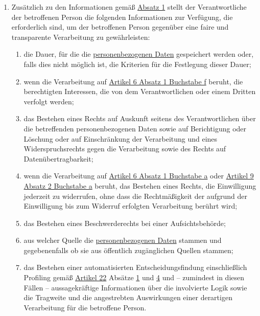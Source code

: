 \begin{enumerate}
\begin{enumerate}
  \end{enumerate}

  \item Zusätzlich zu den Informationen gemäß \hyperref[itm:14-1]{Absatz 1} stellt der Verantwortliche der betroffenen
   Person die folgenden Informationen zur Verfügung, die erforderlich sind, um der betroffenen Person gegenüber eine
   faire und transparente Verarbeitung zu gewährleisten:
  \label{itm:14-2}

  \begin{enumerate}
  
    \item die Dauer, für die die \hyperref[itm:04-1]{personenbezogenen Daten} gespeichert werden oder, falls dies nicht möglich ist, die
     Kriterien für die Festlegung dieser Dauer;
    \label{itm:14-2a}

    \item wenn die Verarbeitung auf \hyperref[itm:06-1f]{Artikel 6 Absatz 1 Buchstabe f} beruht, die berechtigten
     Interessen, die von dem Verantwortlichen oder einem Dritten verfolgt werden;
    \label{itm:14-2b}

    \item das Bestehen eines Rechts auf Auskunft seitens des Verantwortlichen über die betreffenden personenbezogenen
     Daten sowie auf Berichtigung oder Löschung oder auf Einschränkung der Verarbeitung und eines Widerspruchsrechts
     gegen die Verarbeitung sowie des Rechts auf Datenübertragbarkeit;
    \label{itm:14-2c}

    \item wenn die Verarbeitung auf \hyperref[itm:06-1a]{Artikel 6 Absatz 1 Buchstabe a} oder \hyperref[itm:09-2a]
     {Artikel 9 Absatz 2 Buchstabe a} beruht, das Bestehen eines Rechts, die Einwilligung jederzeit zu widerrufen, ohne
     dass die Rechtmäßigkeit der aufgrund der Einwilligung bis zum Widerruf erfolgten Verarbeitung berührt wird;
    \label{itm:14-2d}

    \item das Bestehen eines Beschwerderechts bei einer Aufsichtsbehörde;
    \label{itm:14-2e}

    \item aus welcher Quelle die \hyperref[itm:04-1]{personenbezogenen Daten} stammen und gegebenenfalls ob sie aus öffentlich zugänglichen
     Quellen stammen;
    \label{itm:14-2f}

    \item das Bestehen einer automatisierten Entscheidungsfindung einschließlich Profiling gemäß \hyperref[ch:22]
     {Artikel 22} Absätze \hyperref[itm:22-1]{1} und \hyperref[itm:22-4]{4} und -- zumindest in diesen Fällen --
     aussagekräftige Informationen über die involvierte Logik sowie die Tragweite und die angestrebten Auswirkungen
     einer derartigen Verarbeitung für die betroffene Person.
    \label{itm:14-2g}


\end{enumerate}
\end{enumerate}
